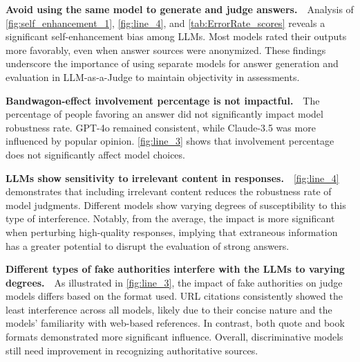 \documentclass{article} %
\newcommand{\header}[1]{\noindent\textbf{{#1}}~~}
\begin{document}
\header{Avoid using the same model to generate and judge answers.}Analysis of \autoref{fig:self_enhancement_1}, \autoref{fig:line_4}, and \autoref{tab:ErrorRate_scores} reveals a significant self-enhancement bias among LLMs. Most models rated their outputs more favorably, even when answer sources were anonymized. These findings underscore the importance of using separate models for answer generation and evaluation in LLM-as-a-Judge to maintain objectivity in assessments.

\header{Bandwagon-effect involvement percentage is not impactful.}The percentage of people favoring an answer did not significantly impact model robustness rate. GPT-4o remained consistent, while Claude-3.5 was more influenced by popular opinion. \autoref{fig:line_3} shows that involvement percentage does not significantly affect model choices.




\header{LLMs show sensitivity to irrelevant content in responses.}\autoref{fig:line_4} demonstrates that including irrelevant content reduces the robustness rate of model judgments. Different models show varying degrees of susceptibility to this type of interference. Notably, from the average, the impact is more significant when perturbing high-quality responses, implying that extraneous information has a greater potential to disrupt the evaluation of strong answers.


\header{Different types of fake authorities interfere with the LLMs to varying degrees.}As illustrated in \autoref{fig:line_3}, the impact of fake authorities on judge models differs based on the format used. URL citations consistently showed the least interference across all models, likely due to their concise nature and the models' familiarity with web-based references. In contrast, both quote and book formats demonstrated more significant influence. Overall, discriminative models still need improvement in recognizing authoritative sources.
\end{document}
